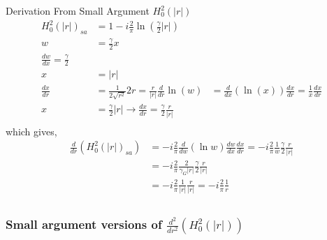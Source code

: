 \documentclass{article}
\newcommand{\0}{\varnothing}
\begin{document}
\begin{minipage}[t]{0.5\textwidth}
{\centering Derivation From Small Argument $H_0^2(|r|)$\ \\}
\begin{align*}
    H_0^2(|r|)_{sa} &= 1 - i \frac{2}{\pi} \ln \left(\frac{\gamma}{2} |r| \right)\\
    w &= \frac{\gamma}{2} x \\
    \frac{dw}{dx} = \frac{\gamma}{2} \\
    x &= |r| \\
    \frac{dx}{dr} &= \frac{1}{2 \sqrt{r^2}} 2 r = \frac{r}{|r|}
    \frac{d}{dr} \ln(w) &= \frac{d}{dx}(\ln(x)) \frac{dx}{dr}  = \frac{1}{x} \frac{dx}{dr}\\
    x &= \frac{\gamma}{2} |r| \rightarrow \frac{dx}{dr} = \frac{\gamma}{2}\frac{r}{|r|}\\
\end{align*}
which gives,
\begin{align*}  
    \frac{d}{dr}\left(H_0^2 (|r|)_{sa}\right) & = - i \frac{2}{\pi} \frac{d}{dw} (\ln w) \frac{dw}{dx} \frac{dx}{dr} 
    = - i \frac{2}{\pi} \frac{1}{w} \frac{\gamma}{2} \frac{r}{|r|} \\
    &= - i \frac{2}{\pi} \frac{2}{\gamma_G |r|} \frac{\gamma}{2} \frac{r}{|r|} \\
    &= - i \frac{2}{\pi} \frac{1}{|r|}\frac{r}{|r|}  = - i \frac{2}{\pi} \frac{1}{r} \\
\end{align*}
\end{minipage}

\subsubsection{Small argument versions of $\frac{d^2}{dr^2}(H_0^2(|r|))$}
\end{document}
